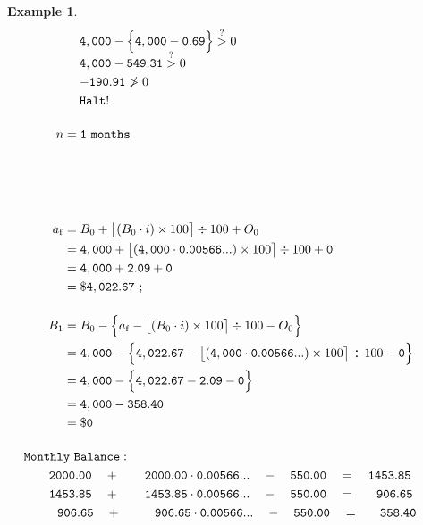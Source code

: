 \documentclass[12pt,letterpaper,oneside]{article}
\newtheorem{example}{Example}[section]
\theoremstyle{remark} %
\begin{document}
\begin{example}
\begin{align*}
	&\quad\;\mathtt{\balanceitf}-\Big\{\mathtt{\amount}-\mathtt{0.69}\Big\}\overset{?}{>}0\\[-6pt]
	&\quad\;\mathtt{\balanceitf}-\mathtt{549.31}\overset{?}{>}0\\
	&\quad\;\mathtt{-190.91}\ngtr 0\\
	&\quad\;\mathtt{Halt!}\\[12pt]
	n&=\mathtt{\monthspitf\ months}\\[60pt] %
	a_{\rm{f}}&=B_{\monthsitf}+\big\lfloor{\left(B_{\monthsitf}\cdot i\right)\times 100}\big\rceil\div 100+O_{\monthsitf}\\
	&=\mathtt{\balanceitf}+\big\lfloor{\left(\mathtt{\balanceitf}\cdot \mathtt{\rate}\right)\times 100}\big\rceil\div 100+\mathtt{\interestitf}\\
	&=\mathtt{\balanceitf}+\mathtt{2.09}+\mathtt{\interestitf}\\
	&=\mathtt{\$\amountfinal}\ ;\\[12pt]
	B_{\monthspitf}&=B_{\monthsitf}-\Big\{a_{\rm{f}}-\big\lfloor{\left(B_{\monthsitf}\cdot i\right)\times 100}\big\rceil\div 100-O_{\monthsitf}\Big\}\\
	&=\mathtt{\balanceitf}-\Big\{\mathtt{\amountfinal}-\big\lfloor{\left(\mathtt{\balanceitf}\cdot \mathtt{\rate}\right)\times 100}\big\rceil\div 100-\mathtt{\interestitf}\Big\}\\
	&=\mathtt{\balanceitf}-\Big\{\mathtt{\amountfinal}-\mathtt{2.09}-\mathtt{\interestitf}\Big\}\\
	&=\mathtt{\balanceitf}-\mathtt{358.40}\\
	&=\mathtt{\$0}\\[12pt]
	&\!\!\!\!\!\!\!\!\!\!\!\!\!\!\!\!\!\!\!\mathtt{Monthly\ Balance:}\\
	&\!\!\!\!\!\!\!\mathtt{2000.00}\quad +\qquad\mathtt{2000.00}\cdot \mathtt{\rate}\quad -\quad \mathtt{550.00}\quad =\quad \mathtt{1453.85}\\
	&\!\!\!\!\!\!\!\mathtt{1453.85}\quad +\qquad\mathtt{1453.85}\cdot \mathtt{\rate}\quad -\quad \mathtt{550.00}\quad =\quad \ \ \mathtt{906.65}\\
	&\!\!\!\!\!\!\!\ \ \mathtt{906.65}\quad +\qquad\ \ \mathtt{906.65}\cdot \mathtt{\rate}\quad -\quad \mathtt{550.00}\quad =\quad\ \ \mathtt{358.40}\\

\end{align*}
\end{example}
\end{document}
